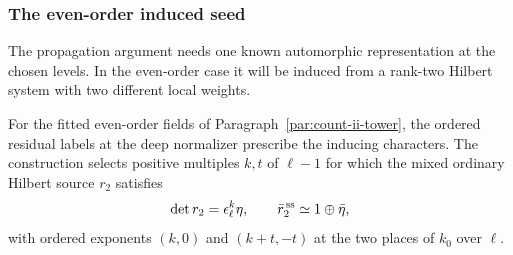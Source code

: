 

\subsubsection{The even-order induced seed}

The propagation argument needs one known automorphic representation at the chosen levels. In the even-order case it will be induced from a rank-two Hilbert system with two different local weights.

\begin{proposition}\label{prop:count-two-seed-characters}
For the fitted even-order fields of Paragraph~\ref{par:count-ii-tower}, the ordered residual labels
at the deep normalizer prescribe the inducing characters.
The construction selects positive multiples \(k,t\) of \(\ell-1\)
for which the mixed ordinary Hilbert source \(r_2\) satisfies 
\[
 \det r_2=\epsilon_\ell^k\eta,\qquad \bar r_2^{\,\rm ss}\simeq1\oplus\bar\eta,
\]
 with ordered exponents \((k,0)\) and \((k+t,-t)\) at the two places of \(k_0\) over \(\ell\).
\end{proposition}

